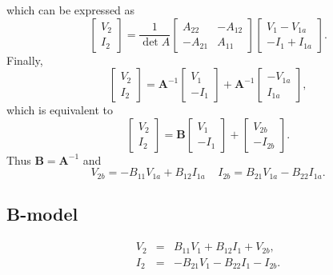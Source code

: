 \documentclass[a4paper, 12pt]{article}
\newcommand{\mat}[1]{\mathbf{#1}}
\newcommand{\bigspace}{\;\;\;\;}
\begin{document}
%
which can be expressed as
%
\begin{equation}
  \begin{bmatrix}
    V_2 \\ I_2
  \end{bmatrix}
  =
  \frac{1}{\det{A}}
  \begin{bmatrix}
    A_{22} & -A_{12} \\
    -A_{21} & A_{11}
  \end{bmatrix}
  \begin{bmatrix}
    V_1 - V_{1a} \\ -I_1 + I_{1a}
  \end{bmatrix}.
\end{equation}
%
Finally,
%
\begin{equation}
  \begin{bmatrix}
    V_2 \\ I_2
  \end{bmatrix}
  =
  \mat{A}^{-1}
  \begin{bmatrix}  
    V_1 \\ -I_1
  \end{bmatrix}
  +
  \mat{A}^{-1}
  \begin{bmatrix}  
    -V_{1a} \\ I_{1a}
  \end{bmatrix},
\end{equation}
%
which is equivalent to
%
\begin{equation}
  \begin{bmatrix}
    V_2 \\ I_2
  \end{bmatrix}
  =
  \mat{B}
  \begin{bmatrix}  
    V_1 \\ -I_1
  \end{bmatrix}
  +
  \begin{bmatrix}  
    V_{2b} \\ -I_{2b}
  \end{bmatrix}.
\end{equation}
%
Thus $\mat{B} = \mat{A}^{-1}$ and
%
\begin{equation}
V_{2b} = -B_{11} V_{1a} + B_{12} I_{1a} \bigspace I_{2b} = B_{21} V_{1a} - B_{22} I_{1a}.
\end{equation}


\subsection{B-model}

\begin{eqnarray}
\label{eqn:BV2}
  V_2 & = & B_{11} V_1 + B_{12} I_1 + V_{2b}, \\
  I_2 & = & -B_{21} V_1 - B_{22} I_1 - I_{2b}.
\label{eqn:BI2}
\end{eqnarray}
\end{document}
